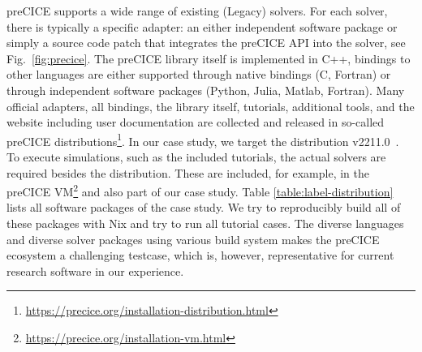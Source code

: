 \documentclass{eceasst}
\begin{document}
preCICE supports a wide range of existing (Legacy) solvers. For each solver, there is typically a specific adapter: an either independent software package or simply a source code patch that integrates the preCICE API into the solver, see Fig.~\ref{fig:precice}.
The preCICE library itself is implemented in C++, bindings to other languages are either supported through native bindings (C, Fortran) or through independent software packages (Python, Julia, Matlab, Fortran).
Many official adapters, all bindings, the library itself, tutorials, additional tools, and the website including user documentation are collected and released in so-called preCICE distributions\footnote{\url{https://precice.org/installation-distribution.html}}.
In our case study, we target the distribution v2211.0~\cite{preciceDistribution}. To execute simulations, such as the included tutorials, the actual solvers are required besides the distribution. These are included, for example, in the preCICE VM\footnote{\url{https://precice.org/installation-vm.html}} and also part of our case study. Table \ref{table:label-distribution} lists all software packages of the case study. We try to reproducibly build all of these packages with Nix and try to run all tutorial cases.
The diverse languages and diverse solver packages using various build system makes the preCICE ecosystem a challenging testcase, which is, however, representative for current research software in our experience.
\end{document}

